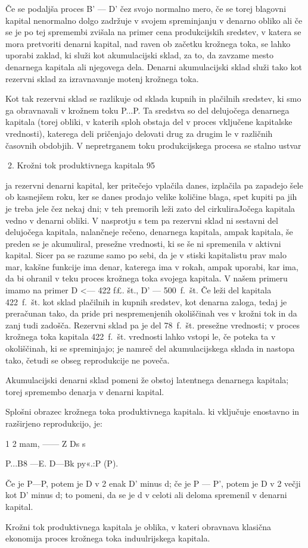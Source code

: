 \documentclass[kapital_02.tex]{subfiles}
\begin{document}
Če se podaljša proces B' — D' čez svojo normalno mero, če se torej blagovni kapital nenormalno dolgo zadržuje v svojem spreminjanju v denarno obliko ali če se je po tej spremembi zvišala na primer cena produkcijskih sredstev, v katera se mora pretvoriti denarni kapital, nad raven ob začetku krožnega toka, se lahko uporabi zaklad, ki služi kot akumulacijski sklad, za to, da zavzame mesto denarnega kapitala ali njegovega dela. Denarni akumulacijski sklad služi tako kot rezervni sklad za izravnavanje motenj krožnega toka.

Kot tak rezervni sklad se razlikuje od sklada kupnih in plačilnih sredstev, ki smo ga obravnavali v krožnem toku P...P. Ta sredstva so del delujočega denarnega kapitala (torej obliki, v katerih sploh obstaja del v proces vključene kapitalske vrednosti), katerega deli pričenjajo delovati drug za drugim le v različnih časovnih obdobjih. V nepretrganem toku produkcijskega procesa se stalno ustvar

 2. Krožni tok produktivnega kapitala 95



 ja rezervni denarni kapital, ker pritečejo vplačila danes, izplačila pa zapadejo šele ob kasnejšem roku, ker se danes prodajo velike količine blaga, spet kupiti pa jih je treba jele čez nekaj dni; v teh premorih leži zato del cirkuliraJočega kapitala vedno v denarni obliki. V nasprotju s tem pa rezervni sklad ni sestavni del delujočega kapitala, nalančneje rečeno, denarnega kapitala, ampak kapitala, še preden se je akumuliral, presežne vrednosti, ki se še ni spremenila v aktivni kapital. Sicer pa se razume samo po sebi, da je v stiski kapitalistu prav malo mar, kakšne funkcije ima denar, katerega ima v rokah, ampak uporabi, kar ima, da bi ohranil v teku proces krožnega toka svojega kapitala. V našem primeru imamo na primer D <— 422 f£. št., D' — 500~f.~št. Če leži del kapitala 422~f.~št. kot sklad plačilnih in kupnih sredstev, kot denarna zaloga, tedaj je preračunan tako, da pride pri nespremenjenih okoliščinah ves v krožni tok in da zanj tudi zadošča. Rezervni sklad pa je del 78~f.~št. presežne vrednosti; v proces krožnega toka kapitala 422~f.~št. vrednosti lahko vstopi le, če poteka ta v okoliščinah, ki se spreminjajo; je namreč del akumulacijskega sklada in nastopa tako, četudi se obseg reprodukcije ne poveča.

Akumulacijski denarni sklad pomeni že obstoj latentnega denarnega kapitala; torej spremembo denarja v denarni kapital.

Splošni obrazec krožnega toka produktivnega kapitala. ki vključuje enostavno in razširjeno reprodukcijo, je:

1 2 mam, —— Z Ds s

P...B8 —E. D—Bk py«.:P (P).

Če je P—P, potem je D v 2 enak D' minus d; če je P — P', potem je D v 2 večji kot D' minus d; to pomeni, da se je d v celoti ali deloma spremenil v denarni kapital.

Krožni tok produktivnega kapitala je oblika, v kateri obravnava klasična ekonomija proces krožnega toka induulrijskega kapitala.

 

\end{document}

